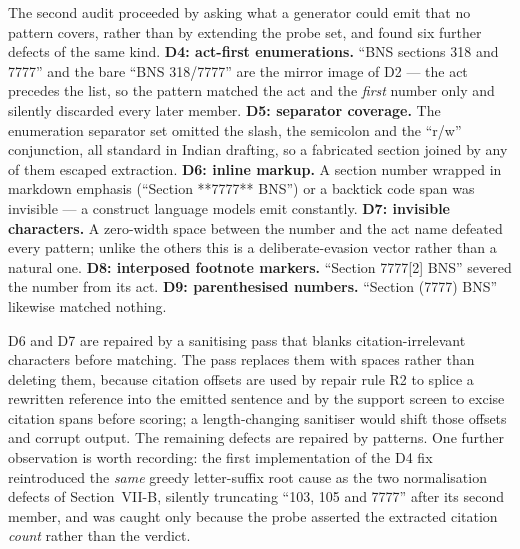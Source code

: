 \documentclass[conference]{IEEEtran}
\begin{document}
The second audit proceeded by asking what a generator could emit that no
pattern covers, rather than by extending the probe set, and found six further
defects of the same kind. \textbf{D4: act-first enumerations.} ``BNS sections
318 and 7777'' and the bare ``BNS 318/7777'' are the mirror image of D2 --- the
act precedes the list, so the pattern matched the act and the \emph{first}
number only and silently discarded every later member. \textbf{D5: separator
coverage.} The enumeration separator set omitted the slash, the semicolon and
the ``r/w'' conjunction, all standard in Indian drafting, so a fabricated
section joined by any of them escaped extraction. \textbf{D6: inline markup.}
A section number wrapped in markdown emphasis (``Section **7777** BNS'') or a
backtick code span was invisible --- a construct language models emit
constantly. \textbf{D7: invisible characters.} A zero-width space between the
number and the act name defeated every pattern; unlike the others this is a
deliberate-evasion vector rather than a natural one. \textbf{D8: interposed
footnote markers.} ``Section 7777[2] BNS'' severed the number from its act.
\textbf{D9: parenthesised numbers.} ``Section (7777) BNS'' likewise matched
nothing.

D6 and D7 are repaired by a sanitising pass that blanks citation-irrelevant
characters before matching. The pass replaces them with spaces rather than
deleting them, because citation offsets are used by repair rule R2 to splice a
rewritten reference into the emitted sentence and by the support screen to
excise citation spans before scoring; a length-changing sanitiser would shift
those offsets and corrupt output. The remaining defects are repaired by
patterns. One further observation is worth recording: the first implementation
of the D4 fix reintroduced the \emph{same} greedy letter-suffix root cause as
the two normalisation defects of Section~VII-B, silently truncating
``103, 105 and 7777'' after its second member, and was caught only because the
probe asserted the extracted citation \emph{count} rather than the verdict.
\end{document}
